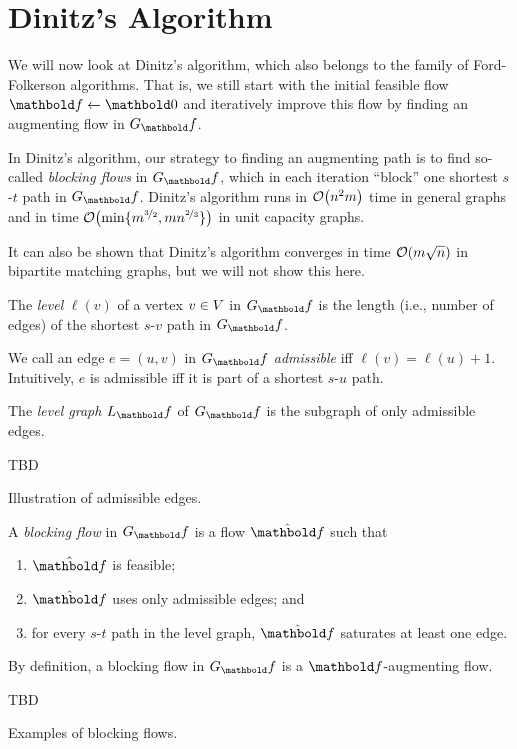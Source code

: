 \section{Dinitz's Algorithm}

We will now look at Dinitz's algorithm, which also belongs to the family of Ford-Folkerson algorithms. That is, we still start with the initial feasible flow $\vf \gets \vZero$ and iteratively improve this flow by finding an augmenting flow in $G_\vf$.

In Dinitz's algorithm, our strategy to finding an augmenting path is to find so-called \emph{blocking flows} in $G_\vf$, which in each iteration ``block'' one shortest $s$-$t$ path in $G_\vf$. Dinitz's algorithm runs in $\LandauO{n^2 m}$ time in general graphs and in time $\LandauO{\min\{m^{\nicefrac{3}{2}}, m n^{\nicefrac{2}{3}}\}}$ in unit capacity graphs.

\begin{rmk}
It can also be shown that Dinitz's algorithm converges in time $\LandauO{m \sqrt{n}}$ in bipartite matching graphs, but we will not show this here.
\end{rmk}

\begin{defn}[Level]
The \emph{level} $\ell(v)$ of a vertex $v \in V$ in $G_\vf$ is the length (i.e., number of edges) of the shortest $s$-$v$ path in $G_\vf$.

We call an edge $e = (u,v)$ in $G_\vf$ \emph{admissible} iff $\ell(v) = \ell(u)+1$. Intuitively, $e$ is admissible iff it is part of a shortest $s$-$u$ path.

The \emph{level graph} $L_\vf$ of $G_\vf$ is the subgraph of only admissible edges.
\end{defn}
\begin{marginfigure}
TBD
\caption{Illustration of admissible edges.}
\end{marginfigure}

\begin{defn}
A \emph{blocking flow} in $G_\vf$ is a flow $\hat{\vf}$ such that \begin{enumerate}
    \item $\hat{\vf}$ is feasible;
    \item $\hat{\vf}$ uses only admissible edges; and
    \item for every $s$-$t$ path in the level graph, $\hat{\vf}$ saturates at least one edge.
\end{enumerate}
\end{defn}
\begin{rmk}
By definition, a blocking flow in $G_\vf$ is a $\vf$-augmenting flow.
\end{rmk}
\begin{marginfigure}
TBD
\caption{Examples of blocking flows.}
\end{marginfigure}

